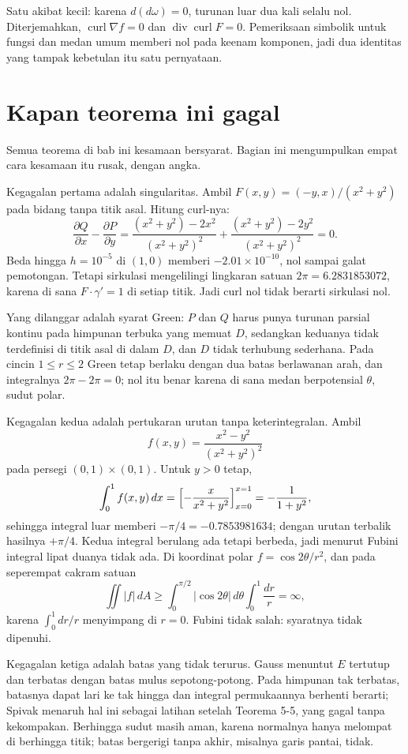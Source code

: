 Satu akibat kecil: karena $d(d\omega)=0$, turunan luar dua kali selalu nol.
Diterjemahkan, $\operatorname{curl}\nabla f=0$ dan
$\operatorname{div}\operatorname{curl}F=0$. Pemeriksaan simbolik untuk fungsi
dan medan umum memberi nol pada keenam komponen, jadi dua identitas yang tampak
kebetulan itu satu pernyataan.

\section{Kapan teorema ini gagal}

Semua teorema di bab ini kesamaan bersyarat. Bagian ini mengumpulkan empat
cara kesamaan itu rusak, dengan angka.

Kegagalan pertama adalah singularitas. Ambil $F(x,y)=(-y,x)/(x^{2}+y^{2})$
pada bidang tanpa titik asal. Hitung curl-nya:
\[
\frac{\partial Q}{\partial x}-\frac{\partial P}{\partial y}
=\frac{(x^{2}+y^{2})-2x^{2}}{(x^{2}+y^{2})^{2}}
+\frac{(x^{2}+y^{2})-2y^{2}}{(x^{2}+y^{2})^{2}}=0 .
\]
Beda hingga $h=10^{-5}$ di $(1,0)$ memberi $-2.01\times10^{-10}$, nol sampai
galat pemotongan. Tetapi sirkulasi
mengelilingi lingkaran satuan $2\pi=6.2831853072$, karena di sana
$F\cdot\gamma'=1$ di setiap titik. Jadi curl nol tidak berarti sirkulasi nol.

Yang dilanggar adalah syarat Green: $P$ dan $Q$ harus punya turunan parsial
kontinu pada himpunan terbuka yang memuat $D$, sedangkan keduanya tidak
terdefinisi di titik asal di dalam $D$, dan $D$ tidak terhubung sederhana. Pada cincin $1\le r\le2$ Green tetap berlaku dengan dua batas
berlawanan arah, dan integralnya $2\pi-2\pi=0$; nol itu benar karena di sana
medan berpotensial $\theta$, sudut polar.

Kegagalan kedua adalah pertukaran urutan tanpa keterintegralan. Ambil
\[
f(x,y)=\frac{x^{2}-y^{2}}{(x^{2}+y^{2})^{2}}
\]
pada persegi $(0,1)\times(0,1)$. Untuk $y>0$ tetap,
\[
\int_{0}^{1}f(x,y)\,dx=\Bigl[-\frac{x}{x^{2}+y^{2}}\Bigr]_{x=0}^{x=1}
=-\frac{1}{1+y^{2}},
\]
sehingga integral luar memberi $-\pi/4=-0.7853981634$; dengan urutan terbalik
hasilnya $+\pi/4$. Kedua integral berulang ada tetapi berbeda, jadi menurut
Fubini integral lipat duanya tidak ada. Di koordinat polar
$f=\cos2\theta/r^{2}$, dan pada seperempat cakram satuan
\[
\iint|f|\,dA\ge\int_{0}^{\pi/2}|\cos2\theta|\,d\theta
\int_{0}^{1}\frac{dr}{r}=\infty ,
\]
karena $\int_{0}^{1}dr/r$ menyimpang di $r=0$. Fubini tidak salah: syaratnya
tidak dipenuhi.

Kegagalan ketiga adalah batas yang tidak terurus. Gauss menuntut $E$ tertutup
dan terbatas dengan batas mulus sepotong-potong. Pada himpunan tak terbatas,
batasnya dapat lari ke tak hingga dan integral permukaannya berhenti berarti;
Spivak menaruh hal ini sebagai latihan setelah Teorema 5-5, yang gagal tanpa
kekompakan. Berhingga sudut masih aman, karena normalnya hanya melompat di
berhingga titik; batas bergerigi tanpa akhir, misalnya garis pantai, tidak.

